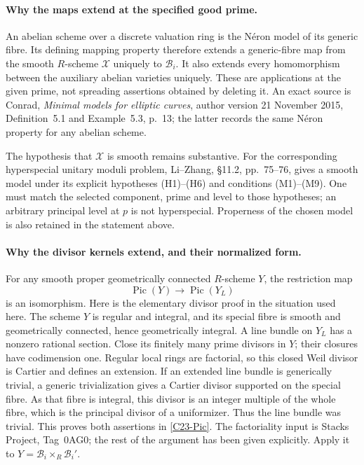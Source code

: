 \paragraph{Why the maps extend at the specified good prime.}
An abelian scheme over a discrete valuation ring is the N\'eron
model of its generic fibre.  Its defining mapping property
therefore extends a generic-fibre map from the smooth
$R$-scheme $\mathcal X$ uniquely to $\mathcal B_i$.
It also extends every homomorphism between the auxiliary
abelian varieties uniquely.  These are applications at the
given prime, not spreading assertions obtained by deleting it.
An exact source is Conrad, \emph{Minimal models for elliptic
curves}, author version 21 November 2015, Definition~5.1 and
Example~5.3, p.~13; the latter records the same N\'eron property
for any abelian scheme.

The hypothesis that $\mathcal X$ is smooth remains substantive.
For the corresponding hyperspecial unitary moduli problem,
Li--Zhang, \S11.2, pp.~75--76, gives a smooth model under its
explicit hypotheses (H1)--(H6) and conditions (M1)--(M9).
One must match the selected component, prime and level to those
hypotheses; an arbitrary principal level at $p$ is not
hyperspecial.  Properness of the chosen model is also retained
in the statement above.

\paragraph{Why the divisor kernels extend, and their normalized form.}
For any smooth proper geometrically connected $R$-scheme
$Y$, the restriction map
\begin{equation}\label{C23-Pic}
                         \operatorname{Pic}(Y)
                           \longrightarrow\operatorname{Pic}(Y_L)
\end{equation}
is an isomorphism.  Here is the elementary divisor proof in
the situation used here.  The scheme $Y$ is regular and
integral, and its special fibre is smooth and geometrically
connected, hence geometrically integral.  A line bundle on
$Y_L$ has a nonzero rational section.  Close its finitely many
prime divisors in $Y$; their closures have codimension one.
Regular local rings are factorial, so this closed Weil divisor
is Cartier and defines an extension.  If an extended line
bundle is generically trivial, a generic trivialization gives
a Cartier divisor supported on the special fibre.  As that
fibre is integral, this divisor is an integer multiple of the
whole fibre, which is the principal divisor of a uniformizer.
Thus the line bundle was trivial.  This proves both assertions
in \eqref{C23-Pic}.  The factoriality input is Stacks Project,
Tag~0AG0; the rest of the argument has been given explicitly.
Apply it to $Y=\mathcal B_i\times_R\mathcal B_i'$.

